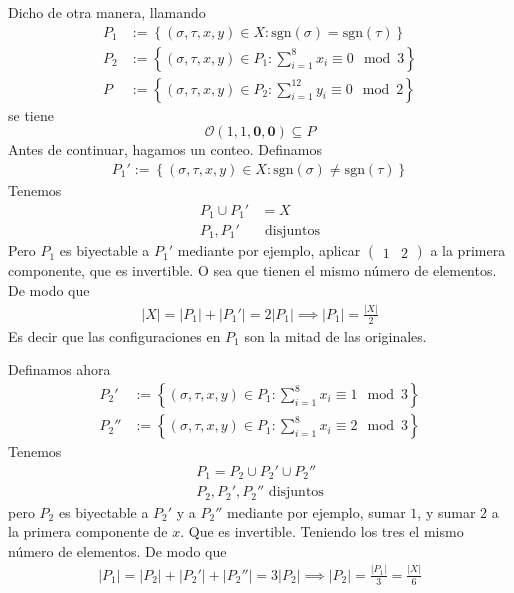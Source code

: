 \documentclass{article}
\theoremstyle{definition}
\newcommand{\sgn}[1]{\text{sgn}\left(#1\right)}
\begin{document}
Dicho de otra manera, llamando
\begin{align*}
    P_1 & :=\left\{(\sigma,\tau,x,y)\in X:\sgn{\sigma}=\sgn{\tau}\right\}          \\
    P_2 & :=\left\{(\sigma,\tau,x,y)\in P_1:\sum_{i=1}^8 x_i\equiv 0\mod 3\right\} \\
    P   & :=\left\{(\sigma,\tau,x,y)\in P_2:
    \sum_{i=1}^{12}y_i\equiv 0\mod 2\right\}
\end{align*}
se tiene
\begin{equation}\label{eq:contencion}
    \mathcal{O}(1,1,\mathbf{0},\mathbf{0})\subseteq P
\end{equation}
Antes de continuar, hagamos un conteo. Definamos
\begin{align*}
    P_1':=\left\{(\sigma,\tau,x,y)\in X:\sgn{\sigma}\neq\sgn{\tau}\right\}
\end{align*}
Tenemos
\begin{align*}
    P_1\cup P_1' & =X                \\
    P_1,P_1'     & \text{ disjuntos}
\end{align*}
Pero $P_1$ es biyectable a $P_1'$ mediante por ejemplo, aplicar $\begin{pmatrix}
        1 & 2
    \end{pmatrix}$ a la primera componente, que es invertible. O sea que tienen el mismo número de elementos. De modo que
\begin{align*}
    |X|=|P_1|+|P_1'|=2|P_1|\implies |P_1|=\frac{|X|}{2}
\end{align*}
Es decir que las configuraciones en $P_1$ son la mitad de las originales.

Definamos ahora
\begin{align*}
    P_2'  & :=\left\{(\sigma,\tau,x,y)\in P_1:\sum_{i=1}^8 x_i\equiv 1\mod 3\right\} \\
    P_2'' & :=\left\{(\sigma,\tau,x,y)\in P_1:\sum_{i=1}^8 x_i\equiv 2\mod 3\right\}
\end{align*}
Tenemos
\begin{align*}
    P_1=P_2\cup P_2'\cup P_2'' \\
    P_2,P_2',P_2''\text{ disjuntos}
\end{align*}
pero $P_2$ es biyectable a $P_2'$ y a $P_2''$ mediante por ejemplo, sumar $1$, y sumar $2$ a la primera componente de $x$. Que es invertible. Teniendo los tres el mismo número de elementos. De modo que
\begin{align*}
    |P_1|=|P_2|+|P_2'|+|P_2''|=3|P_2|\implies |P_2|=\frac{|P_1|}{3}=\frac{|X|}{6}
\end{align*}
\end{document}
